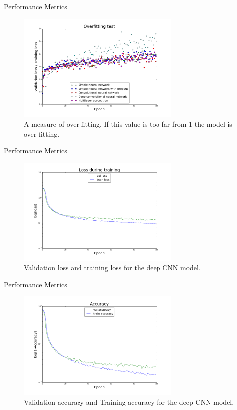\begin{frame}[plain]{Performance Metrics}
\begin{figure}
\includegraphics[width = 0.7\textwidth]{ratio}
\caption{A measure of over-fitting. If this value is too far from 1 the model is over-fitting.}
\end{figure}
\end{frame}

\begin{frame}[plain]{Performance Metrics}
\begin{figure}
\includegraphics[width = 0.7\textwidth]{cnn_loss}
\caption{Validation loss and training loss for the deep CNN model.}
\end{figure}
\end{frame}

\begin{frame}[plain]{Performance Metrics}
\begin{figure}
\includegraphics[width = 0.7\textwidth]{cnn_accuracy}
\caption{Validation accuracy and Training accuracy for the deep CNN model.}
\end{figure}
\end{frame}

